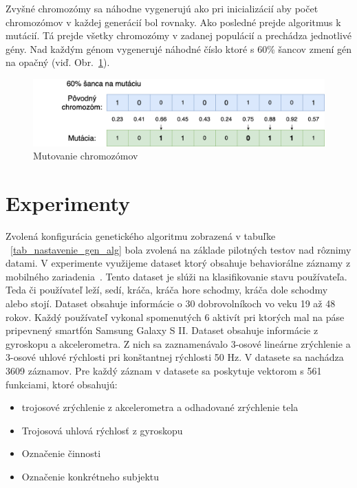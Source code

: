 \documentclass[runningheads]{llncs}
\begin{document}
Zvyšné chromozómy sa náhodne vygenerujú ako pri inicializácií aby počet chromozómov v každej generácií bol rovnaky. 
Ako posledné prejde algoritmus k mutácií. Tá prejde všetky chromozómy v zadanej populácií a prechádza jednotlivé gény.
Nad každým génom vygenerujé náhodné číslo ktoré s 60\% šancov zmení gén na opačný (viď. Obr.~\ref{fig_ga_mutovanie}). 

\begin{figure}
\includegraphics[width=\textwidth]{image/mutacia.png}
\caption{Mutovanie chromozómov} \label{fig_ga_mutovanie}
\end{figure}


\section{Experimenty}

Zvolená konfigurácia genetického algoritmu zobrazená v tabuľke ~\ref{tab_nastavenie_gen_alg} bola zvolená na 
základe pilotných testov nad rôznimy datami. V experimente využijeme dataset ktorý obsahuje behaviorálne 
záznamy z mobilného zariadenia~\cite{ref_dataset_anguita,ref_dataset}. Tento dataset je slúži na klasifikovanie
stavu používateľa. Teda či používateľ leží, sedí, kráča, kráča hore schodmy, kráča dole schodmy alebo stojí.
Dataset obsahuje informácie o 30 dobrovolníkoch vo veku 19 až 48 rokov. Každý používateľ vykonal spomenutých
6 aktivít pri ktorých mal na páse pripevnený smartfón Samsung Galaxy S II. Dataset obsahuje informácie z 
gyroskopu a akcelerometra. Z nich sa zaznamenávalo 3-osové lineárne zrýchlenie a 3-osové uhlové rýchlosti 
pri konštantnej rýchlosti 50 Hz. V datasete sa nachádza 3609 záznamov. Pre každý záznam v datasete sa poskytuje 
vektorom s 561 funkciami, ktoré obsahujú:

\begin{itemize}
\item trojosové zrýchlenie z akcelerometra a odhadované zrýchlenie tela
\item Trojosová uhlová rýchlosť z gyroskopu
\item Označenie činnosti
\item Označenie konkrétneho subjektu
\end{itemize}
\end{document}
